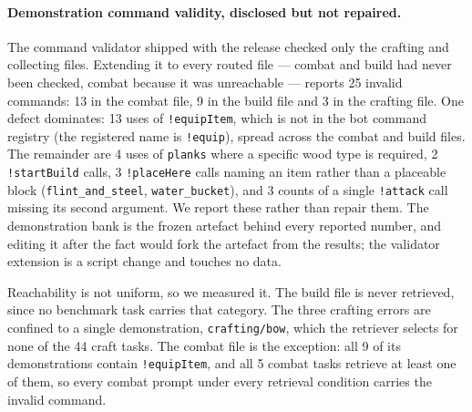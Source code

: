 \documentclass[letterpaper]{article} %
\begin{document}
\paragraph{Demonstration command validity, disclosed but not repaired.}
The command validator shipped with the release checked only the crafting
and collecting files.  Extending it to every routed file --- combat and
build had never been checked, combat because it was unreachable ---
reports 25 invalid commands: 13 in the combat file, 9 in the build file
and 3 in the crafting file.  One defect dominates: 13 uses of
\texttt{!equipItem}, which is not in the bot command registry (the
registered name is \texttt{!equip}), spread across the combat and build
files.  The remainder are 4 uses of \texttt{planks} where a specific
wood type is required, 2 \texttt{!startBuild} calls, 3
\texttt{!placeHere} calls naming an item rather than a placeable block
(\texttt{flint\_and\_steel}, \texttt{water\_bucket}), and 3 counts of a
single \texttt{!attack} call missing its second argument.  We report these rather than repair them.  The
demonstration bank is the frozen artefact behind every reported number,
and editing it after the fact would fork the artefact from the results;
the validator extension is a script change and touches no data.

Reachability is not uniform, so we measured it.  The build file is never
retrieved, since no benchmark task carries that category.  The three
crafting errors are confined to a single demonstration,
\texttt{crafting/bow}, which the retriever selects for none of the 44
craft tasks.  The combat file is the exception: all 9 of its
demonstrations contain \texttt{!equipItem}, and all 5 combat tasks
retrieve at least one of them, so every combat prompt under every
retrieval condition carries the invalid command.
\end{document}
